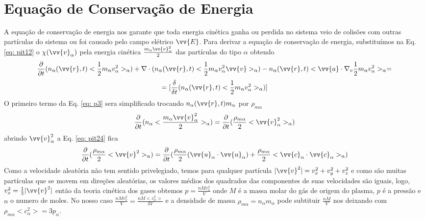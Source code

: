\documentclass[12pt,oneside,a4paper]{abntex2}
\begin{document}
\section{Equação de Conservação de Energia}
A equação de conservação de energia nos garante que toda energia cinética ganha ou perdida no sistema veio de colisões com outras partículas do sistema ou foi causado pelo campo elétrico $\vv{E}$.
Para derivar a equação de conservação de energia, substituímos  na Eq. \ref{eq: pit12} o $\chi (\vv{v}_\alpha)$ pela energia cinética $\frac{m_\alpha \vv{v}^2_\alpha}{2}$ das partículas do tipo $\alpha$ obtendo
\begin{equation}
\label{eq: p3}
\frac{\partial }{\partial t}(n_\alpha(\vv{r},t)<\frac{1}{2}m_\alpha v_{\alpha}^2>_\alpha) + \nabla \cdot (n_\alpha(\vv{r},t)<\frac{1}{2}m_\alpha v_{\alpha}^2 \vv{v} >_\alpha) - n_\alpha(\vv{r},t)<\vv{a} \cdot \nabla_v \frac{1}{2}m_\alpha v_{\alpha}^2>_\alpha = 
\end{equation}
\begin{equation*}
=[\frac{\delta}{\delta t}(n_\alpha(\vv{r},t)<\frac{1}{2}m_\alpha v_{\alpha}^2>_\alpha)]
\end{equation*}
O primeiro termo da Eq. \ref{eq: p3} sera simplificado trocando $ n_\alpha(\vv{r},t) m_\alpha$ por $\rho_{m\alpha}$ 
\begin{equation}
\label{eq: pit24}
\frac{\partial }{\partial t}(n_\alpha<\frac{m_\alpha \vv{v}^2_\alpha}{2}>_\alpha)=\frac{\partial }{\partial t}(\frac{\rho_{m\alpha}}{2}<\vv{v}^2_\alpha>_\alpha)
\end{equation}
abrindo $\vv{v}^2_\alpha$ a Eq. \ref{eq: pit24} fica
\begin{equation}
\label{eq: pit24.1}
\frac{\partial }{\partial t}(\frac{\rho_{m\alpha}}{2}<\vv{v}^2>_\alpha)=\frac{\partial }{\partial t}(\frac{\rho_{m\alpha}}{2}(\vv{u}_\alpha \cdot \vv{u}_\alpha) + \frac{\rho_{m\alpha}}{2}<\vv{c}_\alpha \cdot \vv{c}_\alpha>_\alpha)
\end{equation} 
Como a velocidade aleatória não tem sentido privelegiado, temos para qualquer partícula $|\vv{v}^2| = v_x^2 + v_y^2 + v_z^2$ e como são muitas partículas que se movem em direções aleatórias, os valores médios dos quadrados das componentes de suas velocidades são iguais, logo, $v_x^2 = \frac{1}{3} |\vv{v}^2|$ então da teoria cinética dos gases obtemos $p=\frac{nMv_x^2}{V}$ onde $M$ é a massa molar do gás de origem do plasma, $p$ é a pressão e $n$ o numero de moles. No nosso caso $\frac{nMv_x^2}{V} = \frac{nM <c^2_\alpha>}{3V} $ e a densidade de massa $ \rho_{m\alpha} = n_\alpha m_\alpha$ pode subtituir $\frac{nM}{V}$ nos deixando com $\rho_{m\alpha}<c^2_\alpha>=3p_\alpha$. 
\end{document}
